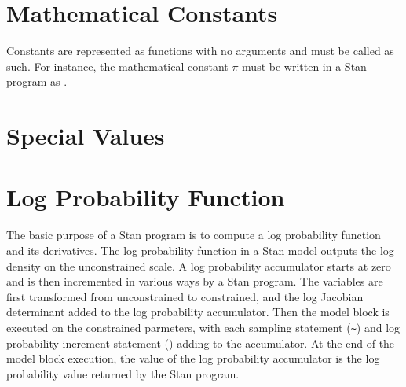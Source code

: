 \section{Mathematical Constants}\label{built-in-constants.section}

Constants are represented as functions with no arguments and must be
called as such.  For instance, the mathematical constant $\pi$ must be
written in a Stan program as .

%
\begin{description}
%
%
%
%
%
%
\end{description}

\section{Special Values}

\begin{description}
%
%
%
%
\end{description}


\section{Log Probability Function}\label{get-lp.section}

The basic purpose of a Stan program is to compute a log probability
function and its derivatives.  The log probability function in a Stan
model outputs the log density on the unconstrained scale.  A log
probability accumulator starts at zero and is then incremented in
various ways by a Stan program.  The variables are first transformed
from unconstrained to constrained, and the log Jacobian determinant
added to the log probability accumulator.  Then the model block is
executed on the constrained parmeters, with each sampling statement
(\Verb|~|) and log probability increment statement
() adding to the accumulator.  At the end
of the model block execution, the value of the log probability
accumulator is the log probability value returned by the Stan program.


